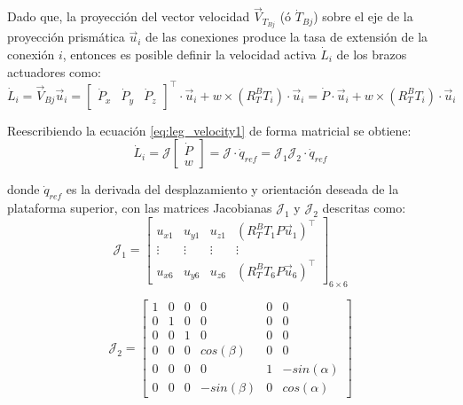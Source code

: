Dado que, la proyección del vector velocidad $\vec{V}_{T_{Bj}}$ (ó $\dot{T}_{Bj}$) sobre el eje de la proyección prismática $\vec{u}_i$ de las conexiones produce la tasa de extensión de la conexión $i$, entonces es posible definir la velocidad activa $\dot{L}_i$ de los brazos actuadores como:
\begin{equation} \label{eq:leg_velocity1}
    \dot{L}_i = \vec{V}_{Bj} \vec{u}_i =  \begin{bmatrix}
        \dot{P}_x & \dot{P}_y & \dot{P}_z
    \end{bmatrix}^{\top} \cdot \vec{u}_i
    + w \times \left(R_T^B T_i \right) \cdot \vec{u}_i = \dot{P} \cdot \vec{u}_i + w \times \left(R_T^B T_i\right) \cdot \vec{u}_i
\end{equation}

Reescribiendo la ecuación \ref{eq:leg_velocity1} de forma matricial se obtiene:
\begin{equation}
    \dot{L}_i = \mathcal{J} \begin{bmatrix}
        \dot{P} \\ w
    \end{bmatrix} =
    \mathcal{J} \cdot \dot{q}_{ref} = \mathcal{J}_1 \mathcal{J}_2 \cdot \dot{q}_{ref}
\end{equation}

donde $\dot{q}_{ref}$ es la derivada del desplazamiento y orientación deseada de la plataforma superior, con las matrices Jacobianas $\mathcal{J}_1$ y $\mathcal{J}_2$ descritas como:
\begin{equation}
    \mathcal{J}_1 = \begin{bmatrix}
        u_{x1} & u_{y1} & u_{z1} & \left( R_T^B T_1 P \vec{u}_1 \right)^{\top} \\
        \vdots & \vdots & \vdots & \vdots \\
        u_{x6} & u_{y6} & u_{z6} & \left( R_T^B T_6 P \vec{u}_6 \right)^{\top} 
    \end{bmatrix}_{6\times6}
\end{equation}

\begin{equation}
    \mathcal{J}_2 = \begin{bmatrix}
        1 & 0 & 0 & 0 & 0 & 0 \\
        0 & 1 & 0 & 0 & 0 & 0 \\
        0 & 0 & 1 & 0 & 0 & 0 \\
        0 & 0 & 0 & cos(\beta) & 0 & 0\\
        0 & 0 & 0 & 0 & 1 & -sin(\alpha)\\
        0 & 0 & 0 & -sin(\beta) & 0 & cos(\alpha)
    \end{bmatrix}
\end{equation}


